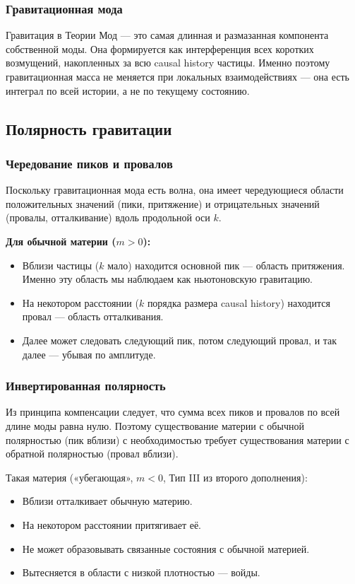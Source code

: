 \documentclass[12pt,a4paper]{article}
\begin{document}
\subsubsection{Гравитационная мода}
Гравитация в Теории Мод --- это самая длинная и размазанная компонента собственной моды. Она формируется как интерференция всех коротких возмущений, накопленных за всю causal history частицы. Именно поэтому гравитационная масса не меняется при локальных взаимодействиях --- она есть интеграл по всей истории, а не по текущему состоянию.

\subsection{Полярность гравитации}

\subsubsection{Чередование пиков и провалов}
Поскольку гравитационная мода есть волна, она имеет чередующиеся области положительных значений (пики, притяжение) и отрицательных значений (провалы, отталкивание) вдоль продольной оси $k$.

\textbf{Для обычной материи ($m > 0$):}
\begin{itemize}
    \item Вблизи частицы ($k$ мало) находится основной пик --- область притяжения. Именно эту область мы наблюдаем как ньютоновскую гравитацию.
    \item На некотором расстоянии ($k$ порядка размера causal history) находится провал --- область отталкивания.
    \item Далее может следовать следующий пик, потом следующий провал, и так далее --- убывая по амплитуде.
\end{itemize}

\subsubsection{Инвертированная полярность}
Из принципа компенсации следует, что сумма всех пиков и провалов по всей длине моды равна нулю. Поэтому существование материи с обычной полярностью (пик вблизи) с необходимостью требует существования материи с обратной полярностью (провал вблизи).

Такая материя («убегающая», $m < 0$, Тип III из второго дополнения):
\begin{itemize}
    \item Вблизи отталкивает обычную материю.
    \item На некотором расстоянии притягивает её.
    \item Не может образовывать связанные состояния с обычной материей.
    \item Вытесняется в области с низкой плотностью --- войды.
\end{itemize}
\end{document}
